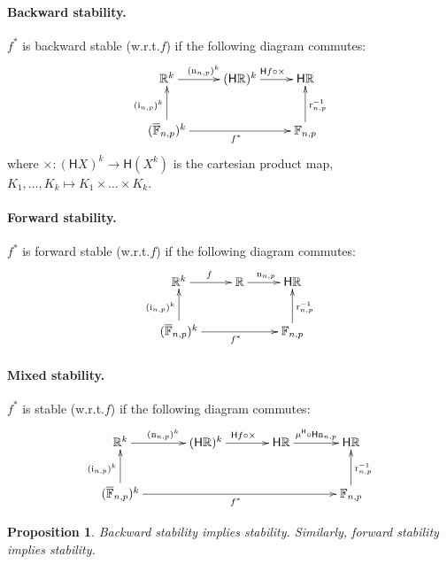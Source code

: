 \documentclass[10pt,a4paper]{article}
\theoremstyle{plain}
\newtheorem{proposition}[theorem]{Proposition}
\theoremstyle{definition}
\newcommand{\F}[1][n,p]{\mathbb{F}_{#1}}
\newcommand{\Ff}[1][n,p]{\overline{\mathbb{F}}_{#1}}
\newcommand{\R}{\mathbb{R}}
\newcommand{\Rep}[1][n,p]{\mathrm{i}_{#1}}
\newcommand{\Round}[1][n,p]{\mathrm{r}_{#1}}
\newcommand{\Haus}{\mathsf{H}}
\newcommand{\inv}{^{-1}}
\newcommand{\nd}[1][n,p]{\mathrm{n}_{#1}}
\begin{document}
\paragraph{Backward stability.} $f^\ast$ is backward stable (w.r.t.\@ $f$) if the following diagram commutes:
\begin{equation}\label{diag:back}
\xymatrix
{
\R^k\ar[r]^{(\nd)^k} & (\Haus\R)^k\ar[r]^{\Haus f\circ \times} & \Haus \R\\
(\Ff)^k\ar[rr]_{f^\ast}\ar[u]^{(\Rep)^k} & & \F\ar[u]_{\Round\inv}
}
\end{equation}
where $\times: (\Haus X)^k\to\Haus (X^k)$ is the cartesian product map, $K_1,\ldots,K_k\mapsto K_1\times \ldots\times K_k$.
\paragraph{Forward stability.} $f^\ast$ is forward stable (w.r.t.\@ $f$) if the following diagram commutes:
\begin{equation}\label{diag:for}
\xymatrix
{
\R^k\ar[r]^{f} & \R\ar[r]^{\nd} & \Haus \R\\
(\Ff)^k\ar[rr]_{f^\ast}\ar[u]^{(\Rep)^k} & & \F\ar[u]_{\Round\inv}
}
\end{equation}
\paragraph{Mixed stability.} $f^\ast$ is stable (w.r.t.\@ $f$) if the following diagram commutes:
\begin{equation}\label{diag:mixed}
\xymatrix@C=8ex
{
\R^k\ar[r]^{(\nd)^k} & (\Haus\R)^k\ar[r]^{\Haus f\circ \times} & \Haus \R\ar[r]^{\mu^{\Haus}\circ \Haus \nd} & \Haus\R \\
(\Ff)^k\ar[rrr]_{f^\ast}\ar[u]^{(\Rep)^k} & & & \F\ar[u]_{\Round\inv}
}
\end{equation}

\begin{proposition}
Backward stability implies stability. Similarly, forward stability implies stability. 
\end{proposition}
\end{document}
